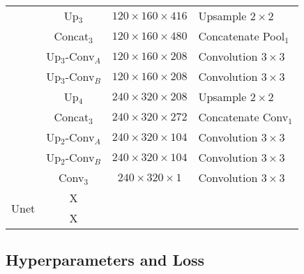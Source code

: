 \documentclass[10pt,twocolumn,letterpaper]{article}
\begin{document}
\begin{table}[h]
\begin{tabular}{c|c|c|p{2.25cm}}
                             & Up$_3$          & $120 \times 160 \times 416$ & Upsample $2\times 2$                          \\
                             & Concat$_3$      & $120 \times 160 \times 480$ & Concatenate Pool$_1$                          \\
                             & Up$_3$-Conv$_A$ & $120 \times 160 \times 208$ & Convolution $3\times 3$                       \\
                             & Up$_3$-Conv$_B$ & $120 \times 160 \times 208$ & Convolution $3\times 3$                       \\
                             & Up$_4$          & $240 \times 320 \times 208$ & Upsample $2\times 2$                          \\
                             & Concat$_3$      & $240 \times 320 \times 272$ & Concatenate Conv$_1$                          \\
                             & Up$_2$-Conv$_A$ & $240 \times 320 \times 104$ & Convolution $3\times 3$                       \\
                             & Up$_2$-Conv$_B$ & $240 \times 320 \times 104$ & Convolution $3\times 3$                       \\
                             & Conv$_3$        & $240 \times 320 \times 1$   & Convolution $3\times 3$                       \\
    \hline
    \multirow{2}{*}{Unet}    & X                                                                                             \\
                             & X                                                                                             \\
    \hline
  \end{tabular}
\end{table}

\subsection{Hyperparameters and Loss}

{\small
  
  
}
\end{document}
